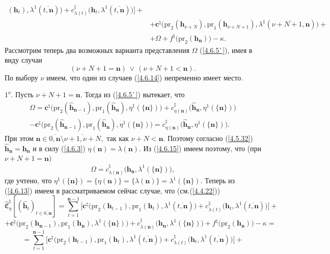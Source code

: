 \documentclass[11pt,twoside,openany]{report}
\newcommand{\bfn}{\begin{equation}}
\newcommand{\efn}{\end{equation}}
\newcommand{\ov}{\overline}
\newcommand{\Om}{\Omega}
\newcommand{\la}{\lambda}
\newcommand{\zc}{{\mathbf c}}
\newcommand{\nn}{{\mathbf n}}
\begin{document}
{{\begin{eqnarray}
(\mathbf{h}_t),\la^1(\ov{t,\nn})\bigl)+ c_{\la(t)}^\natural\bigl(\mathbf{h}_t,\la^1(\ov{t,\nn})\bigl)\bigl] +
&\nonumber\\
&+\zc^\natural\bigl(\mathrm{pr}_2(\mathbf{h}_{\nu+N}),\mathrm{pr}_1(\mathbf{h}_{\nu+N+1}),
\la^1(\ov{\nu+N+1,\nn})\bigl)+
&\nonumber\\
&+\Om + f^\natural\bigl(\mathrm{pr}_2(\mathbf{h}_\nn)\bigl) -\kappa.
&\label{4.6.13}
\end{eqnarray}
 Рассмотрим теперь два возможных варианта представления $\Om$ (\ref{4.6.5`}), имея в виду случаи
 \bfn\label{4.6.14}(\nu+N+1 = \nn)\,\vee\,(\nu+N+ 1< \nn).
 \efn
 По выбору $\nu$ имеем, что один из случаев (\ref{4.6.14}) непременно имеет место.

 $1^o.$ Пусть $\nu+N+1 = \nn.$ Тогда из (\ref{4.6.5`}) вытекает, что
 \begin{eqnarray}
&\Om = \zc^\natural\bigl(\mathrm{pr}_2(\hat{\mathbf{h}}_{\nn-1}),\mathrm{pr}_1(\hat{\mathbf{h}}_\nn),
 \eta^1(\{\nn\})\bigl) + c_{\eta(\nn)}^\natural\bigl(\hat{\mathbf{h}}_\nn,\eta^1(\{\nn\})\bigl)
&\nonumber\\
&- \zc^\natural\bigl(\mathrm{pr}_2(\hat{\mathbf{h}}_{\nn-1}),\mathrm{pr}_1(\hat{\mathbf{h}}_\nn),
 \eta^1(\{\nn\})\bigl)=
 c_{\eta(\nn)}^\natural\bigl(\hat{\mathbf{h}}_\nn,\eta^1(\{\nn\})\bigl).
&\label{4.6.15}
\end{eqnarray}
При этом $\nn\in \ov{0,\nn}\setminus \ov{\nu+1,\nu+N},$ так как $\nu+N < \nn.$ Поэтому
согласно (\ref{4.5.32}) $\hat{\mathbf{h}}_\nn =\mathbf{h}_\nn$ и в силу (\ref{4.6.3})
$\eta(\nn) = \la(\nn).$ Из (\ref{4.6.15}) имеем поэтому, что (при $\nu+N+1 = \nn)$
$$\Om = c_{\la(\nn)}^\natural\bigl(\mathbf{h}_\nn,\la^1(\{\nn\})\bigl),
$$
где учтено, что $\eta^1(\{\nn\}) = \{\eta(\nn)\} = \{\la(\nn)\} = \la^1(\{\nn\}).$ Теперь из
(\ref{4.6.13}) имеем в рассматриваемом сейчас случае, что (см.(\ref{4.4.22}))
$$\widehat{\mathfrak{C}}_\eta^\natural[(\hat{\mathbf{h}}_t)_{t\in\ov{0,\nn}}]=
\sum\limits_{t=1}^{\nn-1}\bigl[\zc^\natural\bigl(\mathrm{pr}_2(\mathbf{h}_{t-1}),\mathrm{pr}_1
(\mathbf{h}_t),\la^1(\ov{t,\nn})\bigl)+ c_{\la(t)}^\natural\bigl(\mathbf{h}_t,\la^1(\ov{t,\nn})\bigl)\bigl] +
$$
$$+ \zc^\natural\bigl(\mathrm{pr}_2(\mathbf{h}_{\nn-1}),\mathrm{pr}_1
(\mathbf{h}_\nn),\la^1(\{\nn\})\bigl)+ c_{\la(\nn)}^\natural\bigl(\mathbf{h}_\nn,\la^1(\{\nn\})\bigl) +
f^\natural\bigl(\mathrm{pr}_2(\mathbf{h}_\nn)\bigl) -\kappa = $$
$$= \sum\limits_{t=1}^{\nn-1}\bigl[\zc^\natural\bigl(\mathrm{pr}_2(\mathbf{h}_{t-1}),\mathrm{pr}_1
(\mathbf{h}_t),\la^1(\ov{t,\nn})\bigl)+ c_{\la(t)}^\natural\bigl(\mathbf{h}_t,\la^1(\ov{t,\nn})\bigl)\bigl] +
$$}}
\end{document}
